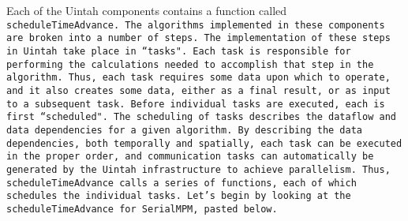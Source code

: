 Each of the Uintah components contains a function called \tt
scheduleTimeAdvance. \normalfont The algorithms implemented in these
components are broken into a number of steps.  The implementation of
these steps in Uintah take place in ``tasks".  Each task is
responsible for performing the calculations needed to accomplish that
step in the algorithm.  Thus, each task requires some data upon which
to operate, and it also creates some data, either as a final result,
or as input to a subsequent task.  Before individual tasks are
executed, each is first ``scheduled".  The scheduling of tasks
describes the dataflow and data dependencies for a given algorithm.
By describing the data dependencies, both temporally and spatially,
each task can be executed in the proper order, and communication tasks
can automatically be generated by the Uintah infrastructure to achieve
parallelism.  Thus, scheduleTimeAdvance calls a series of functions,
each of which schedules the individual tasks.  Let's begin by looking
at the \tt scheduleTimeAdvance \normalfont for \tt SerialMPM,
\normalfont pasted below.

